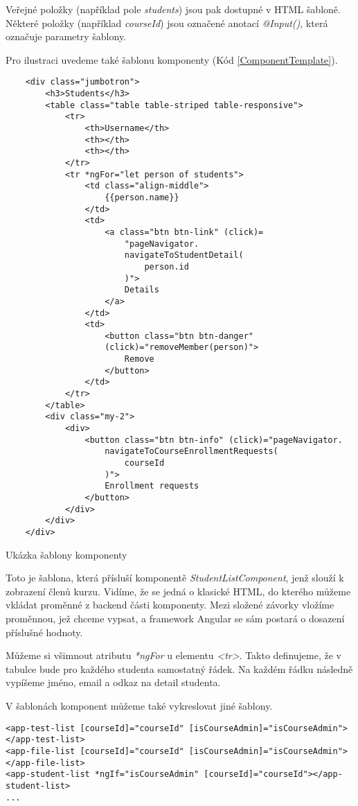 Veřejné položky (například pole \textit{students}) jsou pak dostupné v HTML šabloně. Některé položky (například \textit{courseId}) jsou označené anotací \textit{@Input()}, která označuje parametry šablony.

Pro ilustraci uvedeme také šablonu komponenty (Kód \ref{ComponentTemplate}).

\lstset{style=html}

\begin{program}
	\begin{lstlisting}
	<div class="jumbotron">
		<h3>Students</h3>
		<table class="table table-striped table-responsive">
			<tr>
				<th>Username</th>
				<th></th>
				<th></th>
			</tr>
			<tr *ngFor="let person of students">
				<td class="align-middle">
					{{person.name}}
				</td>
				<td>
					<a class="btn btn-link" (click)=
						"pageNavigator.
						navigateToStudentDetail(
							person.id
						)">
						Details
					</a>
				</td>
				<td>
					<button class="btn btn-danger" 
					(click)="removeMember(person)">
						Remove
					</button>
				</td>
			</tr>
		</table>
		<div class="my-2">
			<div>
				<button class="btn btn-info" (click)="pageNavigator.
					navigateToCourseEnrollmentRequests(
						courseId
					)">
					Enrollment requests
				</button>
			</div>
		</div>
	</div>
	\end{lstlisting}
	\caption{Ukázka šablony komponenty}
	\label{ComponentTemplate}
\end{program}

Toto je šablona, která přísluší komponentě \textit{StudentListComponent}, jenž slouží k zobrazení členů kurzu. Vidíme, že se jedná o klasické HTML, do kterého můžeme vkládat proměnné z backend části komponenty.
Mezi složené závorky vložíme proměnnou, jež chceme vypsat, a framework Angular se sám postará o dosazení příslušné hodnoty.

Můžeme si všimnout atributu \textit{*ngFor} u elementu \textit{<tr>}. Takto definujeme, že v tabulce bude pro každého studenta samostatný řádek.
Na každém řádku následně vypíšeme jméno, email a odkaz na detail studenta.

\vspace{\baselineskip}

V šablonách komponent můžeme také vykreslovat jiné šablony.

\begin{lstlisting}
<app-test-list [courseId]="courseId" [isCourseAdmin]="isCourseAdmin"></app-test-list>
<app-file-list [courseId]="courseId" [isCourseAdmin]="isCourseAdmin"></app-file-list>
<app-student-list *ngIf="isCourseAdmin" [courseId]="courseId"></app-student-list>
...
\end{lstlisting}

